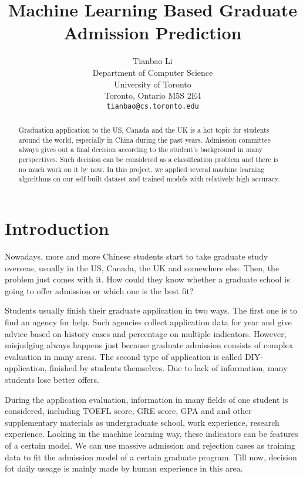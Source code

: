 \documentclass{article}
\title{Machine Learning Based Graduate Admission Prediction}
\author{
  Tianbao Li\\
  Department of Computer Science\\
  University of Toronto\\
  Toronto, Ontario M5S 2E4\\
  \texttt{tianbao@cs.toronto.edu} \\
}
\begin{document}

\maketitle

\begin{abstract}
Graduation application to the US, Canada and the UK is a hot topic for students around the world, especially in China during the past years. Admission committee always gives out a final decision according to the student's background in many perspectives. Such decision can be considered as a classification problem and there is no much work on it by now. In this project, we applied several machine learning algorithms on our self-built dataset and trained models with relatively high accuracy.
\end{abstract}

\section{Introduction}

Nowadays, more and more Chinese students start to take graduate study overseas, usually in the US, Canada, the UK and somewhere else. Then, the problem just comes with it. How could they know whether a graduate school is going to offer admission or which one is the best fit?

Students usually finish their graduate application in two ways. The first one is to find an agency for help. Such agencies collect application data for year and give advice based on history cases and percentage on multiple indicators. However, misjudging always happens just because graduate admission consists of complex evaluation in many areas. The second type of application is called DIY-application, finished by students themselves. Due to lack of information, many students lose better offers.

During the application evaluation, information in many fields of one student is considered, including TOEFL score, GRE score, GPA and and other supplementary materials as undergraduate school, work experience, research experience. Looking in the machine learning way, these indicators can be features of a certain model. We can use massive admission and rejection cases as training data to fit the admission model of a certain graduate program. Till now, decision fot daily useage is mainly made by human experience in this area.
\end{document}
